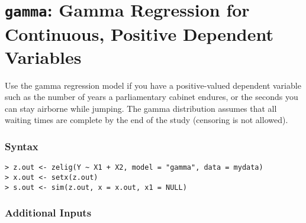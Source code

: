 




\section{{\tt gamma}: Gamma Regression for Continuous, Positive Dependent Variables}\label{gamma}

Use the gamma regression model if you have a positive-valued dependent
variable such as the number of years a parliamentary cabinet endures,
or the seconds you can stay airborne while jumping.  The gamma
distribution assumes that all waiting times are complete by the end
of the study (censoring is not allowed).

\subsubsection{Syntax}

\begin{verbatim}
> z.out <- zelig(Y ~ X1 + X2, model = "gamma", data = mydata)
> x.out <- setx(z.out)
> s.out <- sim(z.out, x = x.out, x1 = NULL)
\end{verbatim}

\subsubsection{Additional Inputs} 

